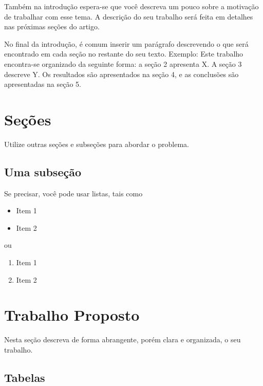 \documentclass[twoside,conference,a4paper]{IEEEtran}
\begin{document}
Também na introdução espera-se que você descreva um pouco sobre a motivação de trabalhar com esse tema. A descrição do seu trabalho será feita em detalhes nas próximas seções do artigo.


No final da introdução, é comum inserir um parágrafo descrevendo o que será encontrado em cada seção no restante do seu texto. Exemplo: Este trabalho encontra-se organizado da seguinte forma: a seção 2 apresenta X. A seção 3 descreve Y. Os resultados são apresentados na seção 4, e as conclusões são apresentadas na seção 5.

\section{Seções}

Utilize outras seções e subseções para abordar o problema. 

\subsection{Uma subseção}

Se precisar, você pode usar listas, tais como

\begin{itemize}
 \item Item 1
 \item Item 2
\end{itemize}
ou
\begin{enumerate}
 \item Item 1
 \item Item 2
\end{enumerate}

\section{Trabalho Proposto}

Nesta seção descreva de forma abrangente, porém clara e organizada, o seu trabalho.

\subsection{Tabelas}
\end{document}
